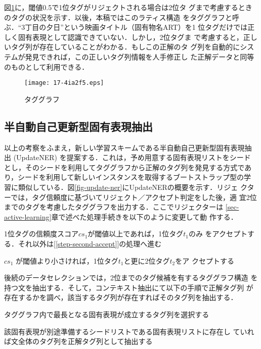 \documentclass[japanese]{jnlp_1.4}
\newenvironment{stepenumerate}{}{}
\begin{document}
図\ref{fig-tag-graph}に，閾値0.5で1位タグがリジェクトされる場合は2位タ
グまで考慮するときのタグの状況を示す．以後，本稿ではこのラティス構造
をタググラフと呼ぶ．``3丁目の夕日''という映画タイトル（固有物名ART）を1
位タグだけでは正しく固有表現として認識できていない．しかし，2位タグま
で考慮すると，正しいタグ列が存在していることがわかる．もしこの正解のタ
グ列を自動的にシステムが発見できれば，この正しいタグ列情報を人手修正し
た正解データと同等のものとして利用できる．

\begin{figure}[t]
\begin{center}
\texttt{[image: 17-4ia2f5.eps]}
\end{center}
\caption{タググラフ}
\label{fig-tag-graph}
\end{figure}


\subsection{半自動自己更新型固有表現抽出}

以上の考察をふまえ，新しい学習スキームである半自動自己更新型固有表現抽
出 (UpdateNER) を提案する．これは，予め用意する固有表現リストをシード
とし，そのシードを利用してタググラフから正解のタグ列を発見する方式であ
り，シードを利用して新しいインスタンスを取得するブートストラップ型の学
習に類似している．図\ref{fig-update-ner}にUpdateNERの概要を示す．リジェ
クターでは，タグ信頼度に基づいてリジェクト／アクセプト判定をした後，適
宜2位までのタグを考慮したタググラフを出力する．ここでリジェクターは
\ref{sec-active-learning}章で述べた処理手続きを以下のように変更して動
作する．

\begin{stepenumerate}
\item 1位タグの信頼度スコア$cs_1$が閾値以上であれば，1位タグ$t_1$のみ
をアクセプトする．それ以外は[\ref{step-second-accept}]の処理へ進む
\item $cs_1$ が閾値より小さければ，1位タグ$t_1$と更に2位タグ$t_2$をア
クセプトする
\label{step-second-accept}
\end{stepenumerate}

後続のデータセレクションでは，2位までのタグ候補を有するタググラフ構造
を持つ文を抽出する．そして，コンテキスト抽出にて以下の手順で正解タグ列
が存在するかを調べ，該当するタグ列が存在すればそのタグ列を抽出する．

\begin{stepenumerate}
\item タググラフ内で最長となる固有表現が成立するタグ列を選択する
\label{step-longest-match}
\item 該固有表現が別途準備するシードリストである固有表現リストに存在し
ていれば文全体のタグ列を正解タグ列として抽出する
\label{step-seed-comparison}
\end{stepenumerate}
\end{document}
